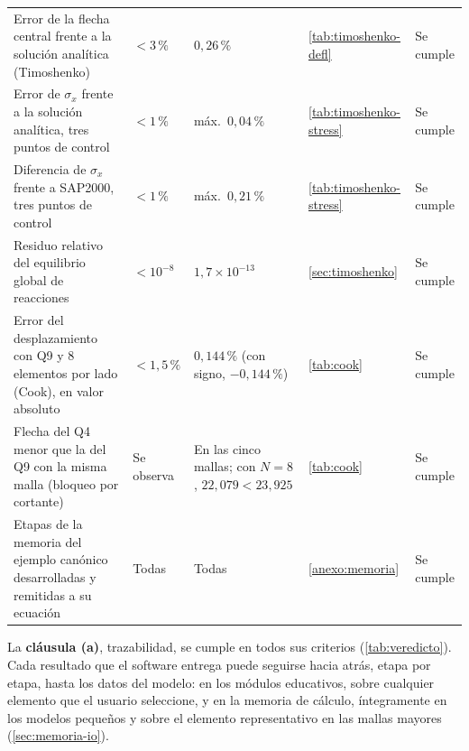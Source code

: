 {\begin{longtable}{@{}>{\raggedright\arraybackslash}p{4.2cm}>{\raggedright\arraybackslash}p{2.5cm}>{\raggedright\arraybackslash}p{3.5cm}>{\raggedright\arraybackslash}p{2.6cm}>{\raggedright\arraybackslash}p{1.9cm}@{}}
Error de la flecha central frente a la solución analítica (Timoshenko) & $< 3\,\%$ & $0{,}26\,\%$ & \autoref{tab:timoshenko-defl} & Se cumple \\
Error de $\sigma_x$ frente a la solución analítica, tres puntos de control & $< 1\,\%$ & máx.\ $0{,}04\,\%$ & \autoref{tab:timoshenko-stress} & Se cumple \\
Diferencia de $\sigma_x$ frente a SAP2000, tres puntos de control & $< 1\,\%$ & máx.\ $0{,}21\,\%$ & \autoref{tab:timoshenko-stress} & Se cumple \\
Residuo relativo del equilibrio global de reacciones & $< 10^{-8}$ & $1{,}7\times10^{-13}$ & \autoref{sec:timoshenko} & Se cumple \\
Error del desplazamiento con Q9 y 8 elementos por lado (Cook), en valor absoluto & $< 1{,}5\,\%$ & $0{,}144\,\%$ (con signo, $-0{,}144\,\%$) & \autoref{tab:cook} & Se cumple \\
Flecha del Q4 menor que la del Q9 con la misma malla (bloqueo por cortante) & Se observa & En las cinco mallas; con $N=8$, $22{,}079 < 23{,}925$ & \autoref{tab:cook} & Se cumple \\
Etapas de la memoria del ejemplo canónico desarrolladas y remitidas a su ecuación & Todas & Todas & \autoref{anexo:memoria} & Se cumple \\
\end{longtable}}
{\singlespacing{}}

La \textbf{cláusula (a)}, trazabilidad, se cumple en todos sus criterios (\autoref{tab:veredicto}). Cada resultado que el software entrega puede seguirse hacia atrás, etapa por etapa, hasta los datos del modelo: en los módulos educativos, sobre cualquier elemento que el usuario seleccione, y en la memoria de cálculo, íntegramente en los modelos pequeños y sobre el elemento representativo en las mallas mayores (\autoref{sec:memoria-io}).

